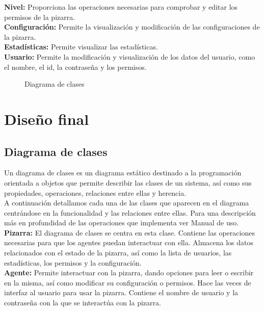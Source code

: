 \textbf{Nivel: }Proporciona las operaciones necesarias para comprobar y editar los permisos de la pizarra.\\

\textbf{Configuración: }Permite la visualización y modificación de las configuraciones de la pizarra.\\

\textbf{Estadísticas: }Permite visualizar las estadísticas.\\

\textbf{Usuario:} Permite la modificación y visualización de los datos del usuario, como el nombre, el id, la contraseña y los permisos.


\begin{sidewaysfigure}
\centering
\clasesanalisis
\caption{Diagrama de clases}
\label{diagramadeclases}
\end{sidewaysfigure}

\section{Diseño final}

\subsection{Diagrama de clases}
Un diagrama de clases es un diagrama estático destinado a la programación orientada a objetos que permite describir las clases de un sistema, así como sus propiedades, operaciones, relaciones entre ellas y herencia.\\

A continuación detallamos cada una de las clases que aparecen en el diagrama centrándose en la funcionalidad y las relaciones entre ellas. Para una descripción más en profundidad de las operaciones que implementa ver Manual de uso.\\

\textbf{Pizarra:} El diagrama de clases se centra en esta clase. Contiene las operaciones necesarias para que los agentes puedan interactuar con ella. Almacena los datos relacionados con el estado de la pizarra, así como la lista de usuarios, las estadísticas, los permisos y la configuración.\\

\textbf{Agente:} Permite interactuar con la pizarra, dando opciones para leer o escribir en la misma, así como modificar su configuración o permisos. Hace las veces de interfaz al usuario para usar la pizarra. Contiene el nombre de usuario y la contraseña con la que se interactúa con la pizarra.\\

